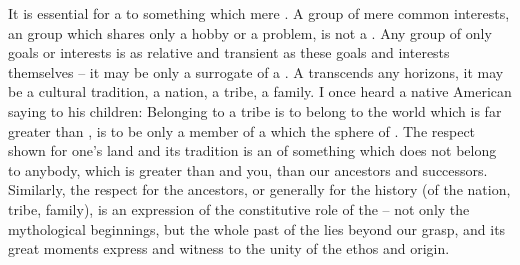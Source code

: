 It is essential for a  to  something which
 mere .  A group of mere common interests, an
 group which shares only a hobby or a problem, is not a
. Any group of only  goals or interests is as relative
and transient as these goals and interests themselves -- it may be only a
surrogate of a . A  transcends any 
horizons, it may be a cultural tradition, a nation, a tribe, a family. I once
heard a native American saying to his children:  Belonging to a tribe
is to belong to the world which is far greater than , is to be only a
member of a  which  the sphere of .  The
respect  shown for one's 
land and its tradition is an  of  something which does
not belong to anybody, which is greater than  and you, than our ancestors
and successors.  Similarly, the respect for the ancestors, or generally for the
history (of the nation, tribe, family), is an expression of the constitutive
role of the  -- not only the mythological beginnings, but the
whole past of the  lies beyond our  grasp, and its
great moments express and witness to the unity of the  ethos and
origin.


